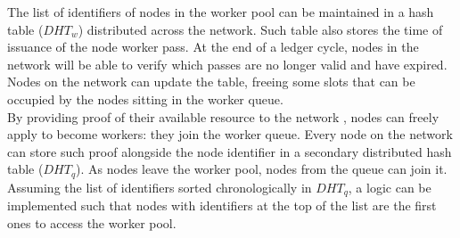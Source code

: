 The list of identifiers of nodes in the worker pool can be maintained in a hash table ($DHT_w$) distributed across the network. Such table also stores the time of issuance of the node worker pass. At the end of a ledger cycle, nodes in the network will be able to verify which passes are no longer valid and have expired. Nodes on the network can update the table, freeing some slots that can be occupied by the nodes sitting in the worker queue. \\

By providing proof of their available resource to the network \cite{coremark,pos}, nodes can freely apply to become workers: they join the worker queue. Every node on the network can store such proof alongside the node identifier in a secondary distributed hash table ($DHT_q$). As nodes leave the worker pool, nodes from the queue can join it. Assuming the list of identifiers sorted chronologically in $DHT_q$, a logic can be implemented such that nodes with identifiers at the top of the list are the first ones to access the worker pool. \\

